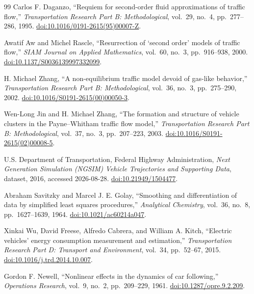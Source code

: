 \documentclass[11pt,a4paper,openany]{book}
\numberwithin{equation}{chapter}
\numberwithin{figure}{chapter}
\numberwithin{table}{chapter}
\begin{document}
\begin{thebibliography}{99}
Carlos F. Daganzo,
``Requiem for second-order fluid approximations of traffic flow,''
\emph{Transportation Research Part B: Methodological}, vol.~29, no.~4, pp.~277--286, 1995.
\href{https://doi.org/10.1016/0191-2615(95)00007-Z}{doi:10.1016/0191-2615(95)00007-Z}.

Awatif Aw and Michel Rascle,
``Resurrection of `second order' models of traffic flow,''
\emph{SIAM Journal on Applied Mathematics}, vol.~60, no.~3, pp.~916--938, 2000.
\href{https://doi.org/10.1137/S0036139997332099}{doi:10.1137/S0036139997332099}.

H. Michael Zhang,
``A non-equilibrium traffic model devoid of gas-like behavior,''
\emph{Transportation Research Part B: Methodological}, vol.~36, no.~3, pp.~275--290, 2002.
\href{https://doi.org/10.1016/S0191-2615(00)00050-3}{doi:10.1016/S0191-2615(00)00050-3}.

Wen-Long Jin and H. Michael Zhang,
``The formation and structure of vehicle clusters in the Payne--Whitham traffic flow model,''
\emph{Transportation Research Part B: Methodological}, vol.~37, no.~3, pp.~207--223, 2003.
\href{https://doi.org/10.1016/S0191-2615(02)00008-5}{doi:10.1016/S0191-2615(02)00008-5}.

U.S. Department of Transportation, Federal Highway Administration,
\emph{Next Generation Simulation (NGSIM) Vehicle Trajectories and Supporting Data},
dataset, 2016, accessed 2026-08-28.
\href{https://doi.org/10.21949/1504477}{doi:10.21949/1504477}.

Abraham Savitzky and Marcel J. E. Golay,
``Smoothing and differentiation of data by simplified least squares procedures,''
\emph{Analytical Chemistry}, vol.~36, no.~8, pp.~1627--1639, 1964.
\href{https://doi.org/10.1021/ac60214a047}{doi:10.1021/ac60214a047}.

Xinkai Wu, David Freese, Alfredo Cabrera, and William A. Kitch,
``Electric vehicles' energy consumption measurement and estimation,''
\emph{Transportation Research Part D: Transport and Environment}, vol.~34, pp.~52--67, 2015.
\href{https://doi.org/10.1016/j.trd.2014.10.007}{doi:10.1016/j.trd.2014.10.007}.

Gordon F. Newell,
``Nonlinear effects in the dynamics of car following,''
\emph{Operations Research}, vol.~9, no.~2, pp.~209--229, 1961.
\href{https://doi.org/10.1287/opre.9.2.209}{doi:10.1287/opre.9.2.209}.


\end{thebibliography}
\end{document}
